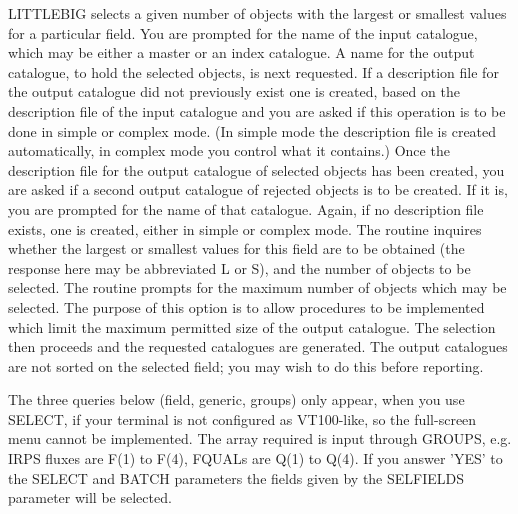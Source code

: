 LITTLEBIG selects a given number of objects with the largest or smallest
values for a particular field.
You are prompted for the name of the input catalogue,
which may be either a master or an index catalogue.
A name for the output catalogue, to hold the selected objects, is next
requested.
If a description file for the output catalogue did not previously exist
one is created, based on the description file of the input
catalogue and you are asked if this operation is to be done
in simple or complex mode.
(In simple mode the description file is created automatically, in complex
mode you control what it contains.)
Once the description file for the output catalogue of selected
objects has been created, you are asked if a second output
catalogue of rejected objects is to be created.
If it is, you are prompted for the name of that catalogue.
Again, if no description file exists, one is created, either in simple or
complex mode.
The routine inquires whether the largest or smallest values for this field
are to be obtained (the response here may be abbreviated L or S), and the
number of objects to be selected.
The routine prompts for the maximum number of objects which may be
selected.
The purpose of this option is to allow procedures to be implemented which
limit the maximum permitted size of the output catalogue.
The selection then proceeds and the requested catalogues are generated.
The output catalogues are not sorted on the selected field; you may wish
to do this before reporting.

The three queries below (field, generic, groups) only appear, when you use
SELECT, if your terminal is not configured as VT100-like, so the full-screen
menu cannot be implemented.
The array required is input through GROUPS, e.g. IRPS fluxes are F(1) to
F(4), FQUALs are Q(1) to Q(4).
If you answer 'YES' to the SELECT and BATCH parameters the fields given by the
SELFIELDS parameter will be selected.

